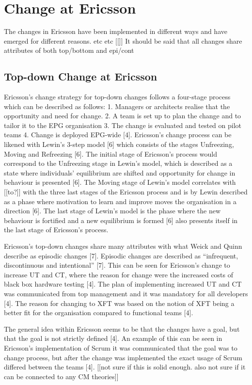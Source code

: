 \documentclass[final_report_innit.tex]{subfiles}
\begin{document}
\section{Change at Ericsson}

The changes in Ericsson have been implemented in different ways and have emerged for different reasons. etc etc [[]]
It should be said that all changes share attributes of both top/bottom and epi/cont

\subsection*{Top-down Change at Ericsson}
Ericsson’s change strategy for top-down changes follows a four-stage process which can be described as follows: 1. Managers or architects realise that the opportunity and need for change. 2. A team is set up to plan the change and to tailor it to the EPG organisation
3. The change is evaluated and tested on pilot teams 4. Change is deployed EPG-wide [4]. Ericsson’s change process can be likened with Lewin’s 3-step model [6] which consists of the stages Unfreezing, Moving and Refreezing [6]. The initial stage of Ericsson’s process would correspond to the Unfreezing stage in Lewin’s model, which is described as a state where individuals’ equilibrium are shifted and opportunity for change in behaviour is presented [6]. The Moving stage of Lewin’s model correlates with [[to?]] with the three last stages of the Ericsson process and is by Lewin described as a phase where motivation to learn and improve moves the organisation in a direction [6]. The last stage of Lewin’s model is the phase where the new behaviour is fortified and a new equilibrium is formed [6] also presents itself in the last stage of Ericsson’s process. 

Ericsson’s top-down changes share many attributes with what Weick and Quinn describe as episodic changes [7]. Episodic changes are described as “infrequent, discontinuous and intentional” [7]. This can be seen for Ericsson’s change to increase UT and CT, where the reason for change were the increased costs of black box hardware testing [4]. The plan of implementing increased UT and CT was communicated from top management and it was mandatory for all developers [4]. The reason for changing to XFT was based on the notion of XFT being a better fit for the organisation compared to functional teams [4]. 

The general idea within Ericsson seems to be that the changes have a goal, but that the goal is not strictly defined [4]. An example of this can be seen in Ericsson’s implementation of Scrum it was communicated that the goal was to change process, but after the change was implemented the exact usage of Scrum differed between the teams [4]. [[not sure if this is solid enough. also not sure if it can be connected to any CM theories]]
\end{document}
